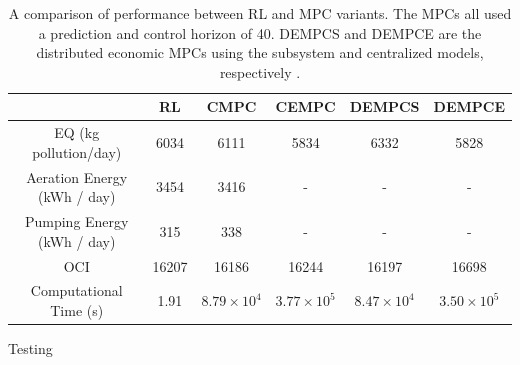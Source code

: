 \begin{table}[H]
\footnotesize
\caption{A comparison of performance between RL and MPC variants. The MPCs all used a prediction and control horizon of 40.  DEMPCS and DEMPCE are the distributed economic MPCs using the subsystem and centralized models, respectively \cite{an_mpc}.}
\centering
\begin{tabular}{c|c|c|c|c|c}
                         &\textbf{RL}     & \textbf{CMPC} & \textbf{CEMPC} & \textbf{DEMPCS} & \textbf{DEMPCE}\\
\hline
EQ (kg pollution/day)  	 &   6034                 & 6111                     &   5834                    &  6332           &	5828	 \\
Aeration Energy (kWh / day) &  3454      &   3416                     &   -       &    -   &	-	 \\
Pumping Energy (kWh / day)  & 315   &   338                     &   -       &   -    &	-	 \\
OCI                       & 16207   &   16186       & 16244         &   16197    &	16698	 \\
Computational Time (s)     &  1.91  &  $8.79 \times 10^4$     &    $3.77 \times 10^5$    &   $8.47 \times 10^4$   &	 $3.50 \times 10^5$	
\label{tab:04rl_vs_mpcs}
\end{tabular}
\end{table}





Testing
\cite{an_mpc, wwtp}


















